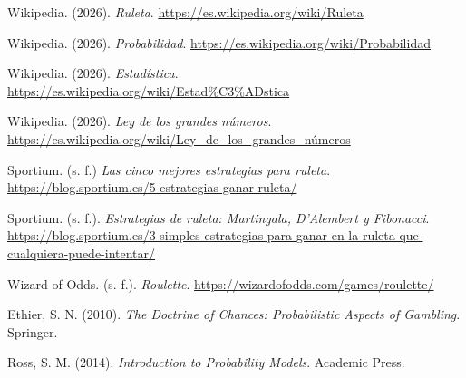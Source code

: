 \documentclass{article}
\begin{document}
\begin{enumerate}[label={[\arabic*]}, leftmargin=*]
    \item Wikipedia. (2026). \textit{Ruleta}. 
    \url{https://es.wikipedia.org/wiki/Ruleta}

    \item Wikipedia. (2026). \textit{Probabilidad}. 
    \url{https://es.wikipedia.org/wiki/Probabilidad}

    \item Wikipedia. (2026). \textit{Estadística}. 
    \url{https://es.wikipedia.org/wiki/Estad%C3%ADstica}

    \item Wikipedia. (2026). \textit{Ley de los grandes números}. 
    \url{https://es.wikipedia.org/wiki/Ley_de_los_grandes_números}

    \item Sportium. (s. f.) \textit{Las cinco mejores estrategias para ruleta}. 
    \url{https://blog.sportium.es/5-estrategias-ganar-ruleta/}

    \item Sportium. (s. f.). \textit{Estrategias de ruleta: Martingala, D'Alembert y Fibonacci}. 
    \url{https://blog.sportium.es/3-simples-estrategias-para-ganar-en-la-ruleta-que-cualquiera-puede-intentar/}

    \item Wizard of Odds. (s. f.). \textit{Roulette}. 
    \url{https://wizardofodds.com/games/roulette/}

    \item Ethier, S. N. (2010). \textit{The Doctrine of Chances: Probabilistic Aspects of Gambling}. Springer.

    \item Ross, S. M. (2014). \textit{Introduction to Probability Models}. Academic Press.
\end{enumerate}
\end{document}

